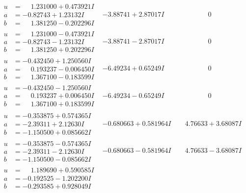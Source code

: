\documentclass[1p]{elsarticle_modified}
\theoremstyle{definition}
\begin{document}
$$\begin{array}{c|c|c}
 \hline 
\begin{aligned}
u &= \phantom{-}1.231000 + 0.473921 I \\
a &= -0.82743 + 1.23132 I \\
b &= \phantom{-}1.381250 - 0.202296 I\end{aligned}
 & -3.88741 + 2.87017 I & \phantom{-0.000000 } 0 \\ \hline\begin{aligned}
u &= \phantom{-}1.231000 - 0.473921 I \\
a &= -0.82743 - 1.23132 I \\
b &= \phantom{-}1.381250 + 0.202296 I\end{aligned}
 & -3.88741 - 2.87017 I & \phantom{-0.000000 } 0 \\ \hline\begin{aligned}
u &= -0.432450 + 1.250560 I \\
a &= \phantom{-}0.193237 - 0.006450 I \\
b &= \phantom{-}1.367100 - 0.183599 I\end{aligned}
 & -6.49234 + 0.65249 I & \phantom{-0.000000 } 0 \\ \hline\begin{aligned}
u &= -0.432450 - 1.250560 I \\
a &= \phantom{-}0.193237 + 0.006450 I \\
b &= \phantom{-}1.367100 + 0.183599 I\end{aligned}
 & -6.49234 - 0.65249 I & \phantom{-0.000000 } 0 \\ \hline\begin{aligned}
u &= -0.353875 + 0.574365 I \\
a &= -2.39311 + 2.12630 I \\
b &= -1.150500 + 0.085662 I\end{aligned}
 & -0.680663 + 0.581964 I & \phantom{-}4.76633 + 3.68087 I \\ \hline\begin{aligned}
u &= -0.353875 - 0.574365 I \\
a &= -2.39311 - 2.12630 I \\
b &= -1.150500 - 0.085662 I\end{aligned}
 & -0.680663 - 0.581964 I & \phantom{-}4.76633 - 3.68087 I \\ \hline\begin{aligned}
u &= \phantom{-}1.189690 + 0.590585 I \\
a &= -0.192525 - 1.202200 I \\
b &= -0.293585 + 0.928049 I\end{aligned}

\end{array}$$
\end{document}
